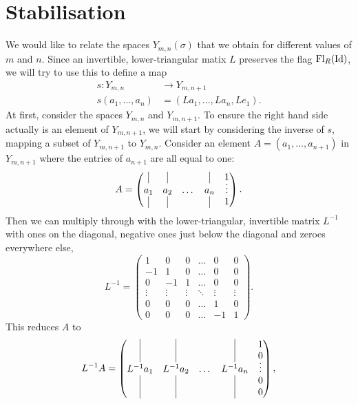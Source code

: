 \section{Stabilisation} 
\label{sec:rum-stabil}

We would like to relate the spaces $Y_{m,n}(\sigma)$ that we obtain
for different values of
$m$ and $n$. Since an invertible, lower-triangular matix $L$ preserves
the flag $\mathrm{Fl}_R(\operatorname{Id})$, we will try to use this to define a map
\begin{align*}
  s : Y_{m,n} &\to Y_{m,n+1} \\
  s(a_1,\dots,a_{n}) &= (La_1,\dots,La_{n},Le_1).
\end{align*}
At first, consider the spaces $Y_{m,n}$ and $Y_{m,n+1}$.
To ensure the right hand side actually is an element of $Y_{m,n+1}$,
we will start by considering the inverse of $s$, mapping a subset of
$Y_{m,n+1}$ to $Y_{m,n}$.
Consider an element $A=(a_1,\dots,a_{n+1})$ in $Y_{m,n+1}$ where
the entries of $a_{n+1}$ are all equal to one:
\[ A = 
\begin{pmatrix}
  \vrule & \vrule & & \vrule & \vspace{-0.5em}
  1 \\
  a_1 & a_2 & \dots & a_{n} & \vdots \\
  \vrule & \vrule & & \vrule & 1
\end{pmatrix}. \] 
Then we can multiply through with the lower-triangular, invertible
matrix $L^{-1}$ with ones on the diagonal, negative ones just below
the diagonal and zeroes everywhere else,
\[ L^{-1} =
\begin{pmatrix}
   1 &  0 & 0 & \dots &  0 & 0 \\
  -1 &  1 & 0 & \dots &  0 & 0 \\
   0 & -1 & 1 & \dots &  0 & 0 \\
   \vdots & \vdots & \vdots & \ddots & \vdots & \vdots \\
   0 &  0 & 0 & \dots &  1 & 0 \\
   0 &  0 & 0 & \dots & -1 & 1
\end{pmatrix}. \]
This reduces $A$ to
\[ L^{-1}A =
\begin{pmatrix}
  \vrule & \vrule & & \vrule & 
  1 \\
  \vrule & \vrule & & \vrule & \vspace{-0.5em}
  0 \\
  L^{-1}a_1 & L^{-1}a_2 & \dots & L^{-1}a_{n} & \vdots \\
  \vrule & \vrule & & \vrule & 0 \\
  \vrule & \vrule & & \vrule & 0
\end{pmatrix}, \]
